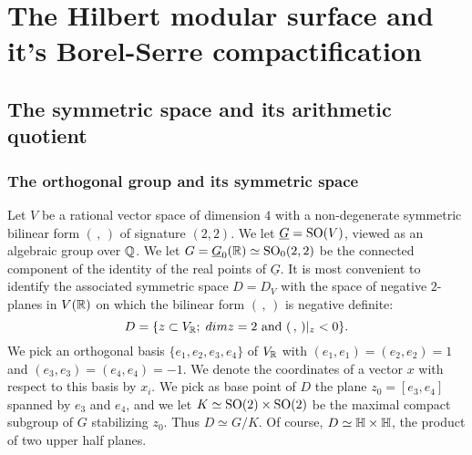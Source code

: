 \section{The Hilbert modular surface and  it's Borel-Serre compactification}


\subsection{The symmetric space and its arithmetic quotient}

\subsubsection{The orthogonal group and its symmetric space}


Let $V$ be a rational vector space of dimension $4$ with a
non-degenerate symmetric bilinear form  $(\,,\,)$ of signature
$(2,2)$.
We let $\underline{G} = \operatorname{SO}(V)$, viewed as an algebraic group over $\mathbb{Q}$.
We let $G=\underline{G}_0(\mathbb{R}) \simeq \operatorname{SO}_0(2,2)$ be the connected
component of the identity of the real points of $\underline{G}$.
It is most convenient to identify the associated symmetric space $D= D_V$ with the
space of negative $2$-planes in $V(\mathbb{R})$ on which the bilinear form $(\,,\,)$ is
negative definite:
\[
D = \{z \subset V_{\mathbb{R}} ; \;\text{$dim z =2$ and $(\,,\,)|_z < 0$}
\}.
\]
We pick an orthogonal basis $\{e_1,e_2,e_3,e_4\}$ of $V_{\mathbb{R}}$ with
$(e_1,e_1)=(e_2,e_2)=1$ and $(e_3,e_3)=(e_4,e_4)=-1$. We denote the
coordinates of a vector $x$ with respect to this basis by $x_i$.
We pick as base point of $D$ the plane $z_0=[e_3,e_4]$ spanned by
$e_3$ and $e_4$, and we let $K \simeq \operatorname{SO}(2)\times \operatorname{SO}(2)$ be the
maximal compact subgroup of $G$ stabilizing $z_0$. Thus $D \simeq
G/K$. Of course, $D \simeq \mathbb{H} \times \mathbb{H}$, the product of two upper
half planes.



